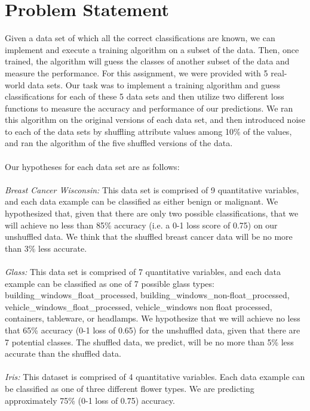 \documentclass[twoside,11pt]{article}
\begin{document}
\section{Problem Statement}
Given a data set of which all the correct classifications are known, we can implement and execute a training algorithm on a subset of the data. Then, once trained, the algorithm will guess the classes of another subset of the data and measure the performance. For this assignment, we were provided with 5 real-world data sets. Our task was to implement a training algorithm and guess classifications for each of these 5 data sets and then utilize two different loss functions to measure the accuracy and performance of our predictions. We ran this algorithm on the original versions of each data set, and then introduced noise to each of the data sets by shuffling attribute values among 10\% of the values, and ran the algorithm of the five shuffled versions of the data. \\ \\
Our hypotheses for each data set are as follows: \\ \\
\textit{Breast Cancer Wisconsin:} This data set is comprised of 9 quantitative variables, and each data example can be classified as either benign or malignant. We hypothesized that, given that there are only two possible classifications, that we will achieve no less than 85\% accuracy (i.e. a 0-1 loss score of 0.75) on our unshuffled data. We think that the shuffled breast cancer data will be no more than 3\% less accurate. \\ \\
\textit{Glass:} This data set is comprised of 7 quantitative variables, and each data example can be classified as one of 7 possible glass types: building\_windows\_float\_processed, building\_windows\_non-float\_processed, vehicle\_windows\_float\_processed, vehicle\_windows non float processed, containers, tableware, or headlamps. We hypothesize that we will achieve no less that 65\% accuracy (0-1 loss of 0.65) for the unshuffled data, given that there are 7 potential classes. The shuffled data, we predict, will be no more than 5\% less accurate than the shuffled data.\\ \\
\textit{Iris:} This dataset is comprised of 4 quantitative variables. Each data example can be classified as one of three different flower types. We are predicting approximately 75\% (0-1 loss of 0.75) accuracy. \\ \\
\end{document}
